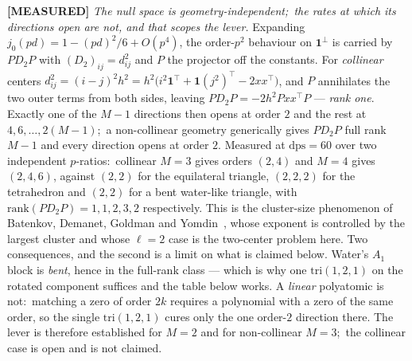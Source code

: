 \documentclass[aps,pra,twocolumn,superscriptaddress,longbibliography]{revtex4-2}
\begin{document}
\textbf{[MEASURED]} \emph{The null space is geometry-independent;\ the rates at
which its directions open are not, and that scopes the lever.}  Expanding
$j_0(pd)=1-(pd)^2/6+O(p^4)$, the order-$p^2$ behaviour on $\mathbf{1}^\perp$ is
carried by $PD_2P$ with $(D_2)_{ij}=d_{ij}^2$ and $P$ the projector off the
constants.  For \emph{collinear} centers
$d_{ij}^2=(i-j)^2h^2=h^2\bigl(i^2\mathbf{1}^{\!\top}+\mathbf{1}(j^2)^{\!\top}-2xx^{\!\top}\bigr)$,
and $P$ annihilates the two outer terms from both sides, leaving
$PD_2P=-2h^2Pxx^{\!\top}P$ --- \emph{rank one}.  Exactly one of the $M-1$
directions then opens at order $2$ and the rest at $4,6,\dots,2(M-1)$;\ a
non-collinear geometry generically gives $PD_2P$ full rank $M-1$ and every
direction opens at order $2$.  Measured at $\mathrm{dps}=60$ over two
independent $p$-ratios:\ collinear $M=3$ gives orders $(2,4)$ and $M=4$ gives
$(2,4,6)$, against $(2,2)$ for the equilateral triangle, $(2,2,2)$ for the
tetrahedron and $(2,2)$ for a bent water-like triangle, with
$\mathrm{rank}(PD_2P)=1,1,2,3,2$ respectively.  This is the cluster-size
phenomenon of Batenkov, Demanet, Goldman and
Yomdin~\cite{batenkov_demanet_goldman_yomdin2019}, whose exponent is controlled
by the largest cluster and whose $\ell=2$ case is the two-center problem here.
Two consequences, and the second is a limit on what is claimed below.  Water's
$A_1$ block is \emph{bent}, hence in the full-rank class --- which is why one
$\mathrm{tri}(1,2,1)$ on the rotated component suffices and the table below
works.  A \emph{linear} polyatomic is not:\ matching a zero of order $2k$
requires a polynomial with a zero of the same order, so the single
$\mathrm{tri}(1,2,1)$ cures only the one order-$2$ direction there.  The lever
is therefore established for $M=2$ and for non-collinear $M=3$;\ the collinear
case is open and is not claimed.
\end{document}
